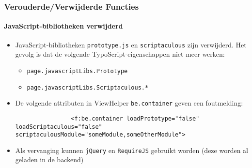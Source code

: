 \begin{frame}[fragile]
	\frametitle{Verouderde/Verwijderde Functies}
	\framesubtitle{JavaScript-bibliotheken verwijderd}

	\begin{itemize}

		\item JavaScript-bibliotheken \texttt{prototype.js} en \texttt{scriptaculous} zijn verwijderd.
			Het gevolg is dat de volgende TypoScript-eigenschappen niet meer werken:

			\begin{itemize}
				\item \texttt{page.javascriptLibs.Prototype}
				\item \texttt{page.javascriptLibs.Scriptaculous.*}
			\end{itemize}

		\item De volgende attributen in ViewHelper \texttt{be.container} geven een foutmelding:
			\begin{lstlisting}
				<f:be.container loadPrototype="false" loadScriptaculous="false" scriptaculousModule="someModule,someOtherModule">
			\end{lstlisting}

		\item Als vervanging kunnen \texttt{jQuery} en \texttt{RequireJS} gebruikt worden\newline
			(deze worden al geladen in de backend)

	\end{itemize}

\end{frame}



